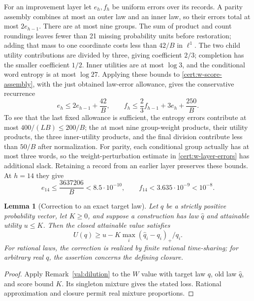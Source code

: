 \documentclass[11pt]{article}
\numberwithin{equation}{section}
\newtheorem{lemma}[theorem]{Lemma}
\theoremstyle{definition}
\theoremstyle{remark}
\begin{document}
For an improvement layer let $e_h,f_h$ be uniform errors over its records.
A parity assembly combines at most an outer law and an inner law, so
their errors total at most $2e_{h-1}$.  There are at most nine groups.
The sum of product and count roundings leaves fewer than 21 missing
probability units before restoration; adding that mass to one coordinate
costs less than $42/B$ in $\ell^1$.  The two child utility contributions
are divided by three, giving coefficient $2/3$; completion has the
smaller coefficient $1/2$.  Inner utilities are at most $\log3$, and
the conditional word entropy is at most $\log27$.  Applying these
bounds to \eqref{cert:w-score-assembly}, with the just obtained
law-error allowance, gives the conservative recurrence
\begin{equation}
 e_h\le2e_{h-1}+\frac{42}{B},\qquad
 f_h\le\frac23 f_{h-1}+3e_h+\frac{250}{B}.
 \label{cert:w-layer-errors}
\end{equation}
To see that the last fixed allowance is sufficient, the entropy errors
contribute at most $400/(LB)\le200/B$; the at most nine group-weight
products, their utility products, the three inner-utility products, and
the final division contribute less than $50/B$ after normalization.
For parity, each conditional group actually has at most three words, so
the weight-perturbation estimate in \eqref{cert:w-layer-errors} has
additional slack.  Retaining a record from an earlier layer preserves
these bounds.  At $h=14$ they give
\begin{equation}
 e_{14}\le\frac{3637206}{B}<8.5\cdot10^{-10},\qquad
 f_{14}<3.635\cdot10^{-9}<10^{-8}.
 \label{cert:w-library-errors}
\end{equation}

\begin{lemma}[Correction to an exact target law]
\label{cert:w-correction}
Let $q$ be a strictly positive probability vector, let $K\ge0$, and
suppose a construction has law $\widehat q$ and attainable utility $u\le K$.
Then the closed attainable value satisfies
\[
 U(q)\ge u-K\max_i(\widehat q_i-q_i)_+/q_i.
\]
For rational laws, the correction is realized by finite rational time-sharing;
for arbitrary real $q$, the assertion concerns the defining closure.
\end{lemma}
\begin{proof}
Apply Remark~\ref{val:dilution} to the $W$ value with target law $q$,
old law $\widehat q$, and score bound $K$.  Its singleton mixture gives
the stated loss.  Rational approximation and closure permit real mixture
proportions.
\end{proof}
\end{document}
